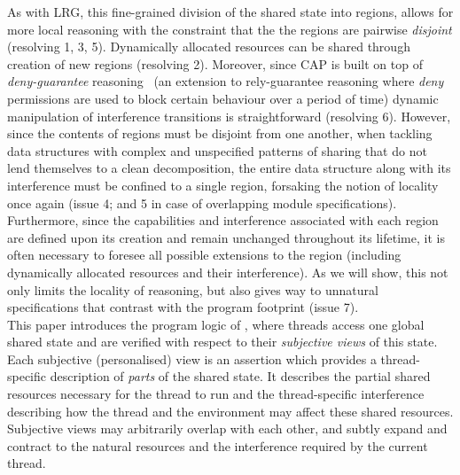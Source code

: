 As with LRG, this fine-grained division of the shared state into regions, allows for more local reasoning with the constraint that the the regions are pairwise \emph{disjoint} (resolving 1, 3, 5). Dynamically allocated resources can be shared through creation of new regions (resolving 2). Moreover, since CAP is built on top of \emph{deny-guarantee} reasoning~\cite{dg} (an extension to rely-guarantee reasoning where \emph{deny} permissions are used to block certain behaviour over a period of time) dynamic manipulation of interference transitions is straightforward (resolving 6). However, since the contents of regions must be disjoint from one another, when tackling data structures with complex and unspecified patterns of sharing that do not lend themselves to a clean decomposition, the entire data structure along with its interference must be confined to a single region, forsaking the notion of locality once again (issue 4; and 5 in case of overlapping module specifications). Furthermore, since the capabilities and interference associated with each region are defined upon its creation and remain unchanged throughout its lifetime, it is often necessary to foresee all possible extensions to the region (including dynamically allocated resources and their interference). As we will show, this not only limits the locality of reasoning, but also gives way to unnatural specifications that contrast with the program footprint (issue 7).\\
%
%
%
\indent This paper introduces the program logic of \colosl, where threads access one global shared state and are verified with respect to their \emph{subjective views} of this state. Each subjective (personalised) view  is an assertion which provides a thread-specific description of \emph{parts} of the shared state. It describes the partial shared resources necessary for the thread to run and the thread-specific interference describing how the thread and the environment may affect these shared resources. Subjective views may arbitrarily overlap with each other, and subtly expand and contract to the natural resources and the interference required by  the current thread. 
